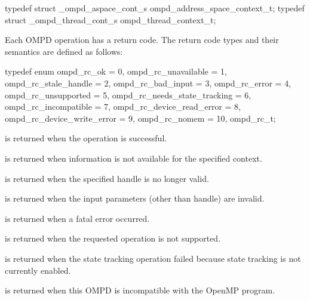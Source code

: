 \format

\begin{ccppspecific}
\begin{ompSyntax}
typedef struct _ompd_aspace_cont_s ompd_address_space_context_t;
typedef struct _ompd_thread_cont_s ompd_thread_context_t;
\end{ompSyntax}
\end{ccppspecific}


\label{ompd:ompd_rc_t}

Each OMPD operation has a return code. The return code types and their semantics are defined as 
follows:

\format

\begin{ccppspecific}
\begin{ompSyntax}
typedef enum {
  ompd_rc_ok = 0,
  ompd_rc_unavailable = 1,
  ompd_rc_stale_handle = 2,
  ompd_rc_bad_input = 3,
  ompd_rc_error = 4,
  ompd_rc_unsupported = 5,
  ompd_rc_needs_state_tracking = 6,
  ompd_rc_incompatible = 7,
  ompd_rc_device_read_error = 8,
  ompd_rc_device_write_error = 9,
  ompd_rc_nomem = 10,
} ompd_rc_t;	
\end{ompSyntax}
\end{ccppspecific}


\descr
\label{ompd:ompd_rc_ok}
 is returned when the operation is successful.

\label{ompd:ompd_rc_unavailable}
 is returned when 
information is not available for the specified context.

\label{ompd:ompd_rc_stale_handle}
 is returned when
the specified handle is no longer valid.

\label{ompd:ompd_rc_bad_input}
 is returned when
the input parameters (other than handle) are invalid. 

\label{ompd:ompd_rc_error}
 is returned when
a fatal error occurred.

\label{ompd:ompd_rc_unsupported}
 is returned when
the requested operation is not supported.

\label{ompd:ompd_rc_needs_state_tracking}
 is returned when
the state tracking operation failed because state tracking is not currently enabled.

\label{ompd:ompd_rc_incompatible}
 is returned when
this OMPD is incompatible with the OpenMP program.

